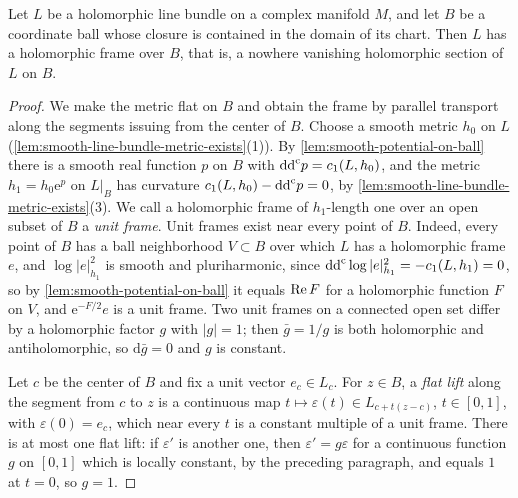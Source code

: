 \begin{lemma}\label{lem:line-bundle-ball-frame}
Let $L$ be a holomorphic line bundle on a complex manifold $M$, and let $B$ be a coordinate ball whose closure is contained in the domain of its chart. Then $L$ has a holomorphic frame over $B$, that is, a nowhere vanishing holomorphic section of $L$ on $B$.
\end{lemma}
\begin{proof}
We make the metric flat on $B$ and obtain the frame by parallel transport along the segments issuing from the center of $B$. Choose a smooth metric $h_0$ on $L$ (\cref{lem:smooth-line-bundle-metric-exists}(1)). By \cref{lem:smooth-potential-on-ball} there is a smooth real function $p$ on $B$ with $\mathrm{dd}^{\mathrm{c}} p=c_1(L,h_0)$, and the metric $h_1=h_0\mathrm e^{p}$ on $L|_B$ has curvature $c_1(L,h_0)-\mathrm{dd}^{\mathrm{c}} p=0$, by \cref{lem:smooth-line-bundle-metric-exists}(3). We call a holomorphic frame of $h_1$-length one over an open subset of $B$ a \emph{unit frame}. Unit frames exist near every point of $B$. Indeed, every point of $B$ has a ball neighborhood $V\subset B$ over which $L$ has a holomorphic frame $e$, and $\log|e|_{h_1}^2$ is smooth and pluriharmonic, since $\mathrm{dd}^{\mathrm{c}}\log|e|_{h_1}^2=-c_1(L,h_1)=0$, so by \cref{lem:smooth-potential-on-ball} it equals $\operatorname{Re} F$ for a holomorphic function $F$ on $V$, and $\mathrm e^{-F/2}e$ is a unit frame. Two unit frames on a connected open set differ by a holomorphic factor $g$ with $|g|=1$; then $\bar g=1/g$ is both holomorphic and antiholomorphic, so $\mathrm d\bar g=0$ and $g$ is constant.

Let $c$ be the center of $B$ and fix a unit vector $e_c\in L_c$. For $z\in B$, a \emph{flat lift} along the segment from $c$ to $z$ is a continuous map $t\mapsto\varepsilon(t)\in L_{c+t(z-c)}$, $t\in[0,1]$, with $\varepsilon(0)=e_c$, which near every $t$ is a constant multiple of a unit frame. There is at most one flat lift: if $\varepsilon'$ is another one, then $\varepsilon'=g\varepsilon$ for a continuous function $g$ on $[0,1]$ which is locally constant, by the preceding paragraph, and equals $1$ at $t=0$, so $g=1$.


\end{proof}
